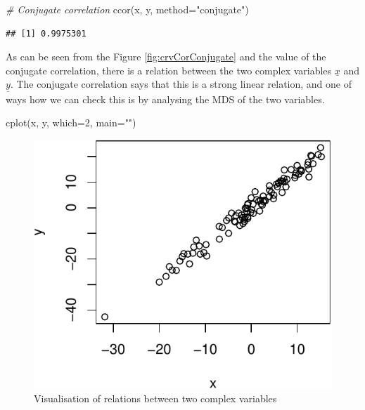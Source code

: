 \documentclass[
]{book}
\newenvironment{Shaded}{\begin{snugshade}}{\end{snugshade}}
\newcommand{\AttributeTok}[1]{\textcolor[rgb]{0.77,0.63,0.00}{#1}}
\newcommand{\CommentTok}[1]{\textcolor[rgb]{0.56,0.35,0.01}{\textit{#1}}}
\newcommand{\DecValTok}[1]{\textcolor[rgb]{0.00,0.00,0.81}{#1}}
\newcommand{\FunctionTok}[1]{\textcolor[rgb]{0.00,0.00,0.00}{#1}}
\newcommand{\NormalTok}[1]{#1}
\newcommand{\StringTok}[1]{\textcolor[rgb]{0.31,0.60,0.02}{#1}}
\begin{document}
\begin{Shaded}
\begin{Highlighting}[]
\CommentTok{\# Conjugate correlation}
\FunctionTok{ccor}\NormalTok{(x, y, }\AttributeTok{method=}\StringTok{"conjugate"}\NormalTok{)}
\end{Highlighting}
\end{Shaded}

\begin{verbatim}
## [1] 0.9975301
\end{verbatim}

As can be seen from the Figure \ref{fig:crvCorConjugate} and the value of the conjugate correlation, there is a relation between the two complex variables \(\underline{x}\) and \(\underline{y}\). The conjugate correlation says that this is a strong linear relation, and one of ways how we can check this is by analysing the MDS of the two variables.

\begin{Shaded}
\begin{Highlighting}[]
\FunctionTok{cplot}\NormalTok{(x, y, }\AttributeTok{which=}\DecValTok{2}\NormalTok{, }\AttributeTok{main=}\StringTok{""}\NormalTok{)}
\end{Highlighting}
\end{Shaded}

\begin{figure}
\centering
\includegraphics{Svetunkov---Svetunkov---Complex-Valued-Econometrics_files/figure-latex/crvCorConjugateMDS-1.pdf}
\caption{\label{fig:crvCorConjugateMDS}Visualisation of relations between two complex variables}
\end{figure}
\end{document}
